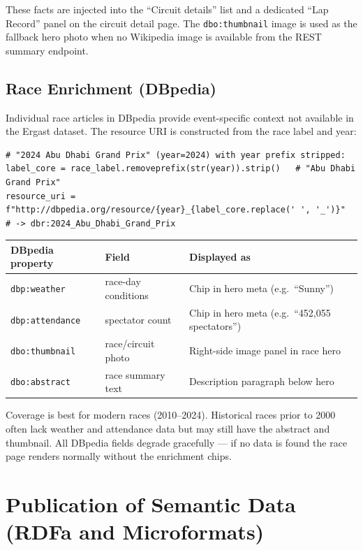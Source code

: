 \documentclass[12pt,a4paper]{article}
\begin{document}
These facts are injected into the ``Circuit details'' list and a dedicated
``Lap Record'' panel on the circuit detail page.
The \texttt{dbo:thumbnail} image is used as the fallback hero photo when no
Wikipedia image is available from the REST summary endpoint.

\subsection{Race Enrichment (DBpedia)}

Individual race articles in DBpedia provide event-specific context not available
in the Ergast dataset. The resource URI is constructed from the race label and year:

\begin{lstlisting}[style=python, caption={DBpedia race URI construction (external\_data.py)}]
# "2024 Abu Dhabi Grand Prix" (year=2024) with year prefix stripped:
label_core = race_label.removeprefix(str(year)).strip()   # "Abu Dhabi Grand Prix"
resource_uri = f"http://dbpedia.org/resource/{year}_{label_core.replace(' ', '_')}"
# -> dbr:2024_Abu_Dhabi_Grand_Prix
\end{lstlisting}

\begin{center}
\begin{tabular}{@{}lll@{}}
\toprule
\textbf{DBpedia property} & \textbf{Field} & \textbf{Displayed as} \\
\midrule
\texttt{dbp:weather}    & race-day conditions & Chip in hero meta (e.g.\ ``Sunny'') \\
\texttt{dbp:attendance} & spectator count     & Chip in hero meta (e.g.\ ``452,055 spectators'') \\
\texttt{dbo:thumbnail}  & race/circuit photo  & Right-side image panel in race hero \\
\texttt{dbo:abstract}   & race summary text   & Description paragraph below hero \\
\bottomrule
\end{tabular}
\end{center}

Coverage is best for modern races (2010--2024). Historical races prior to 2000
often lack weather and attendance data but may still have the abstract and thumbnail.
All DBpedia fields degrade gracefully --- if no data is found the race page renders
normally without the enrichment chips.

\section{Publication of Semantic Data (RDFa and Microformats)}
\end{document}
